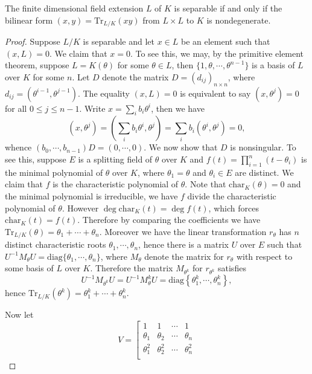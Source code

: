 \begin{theorem}\label{SeparaVSnondege}
The finite dimensional field extension $L$ of $K$ is separable if and only if the bilinear form $(x,y)=\mathrm{Tr}_{L/K}(xy)$ from $L\times L$ to $K$ is nondegenerate.
\end{theorem}
\begin{proof}
Suppose $L/K$ is separable and let $x\in L$ be an element such that $(x,L)=0$. We claim that $x=0$. To see this, we may, by the primitive element theorem, suppose $L=K(\theta)$ for some $\theta\in L$, then $\{1,\theta,\cdots,\theta^{n-1}\}$ is a basis of $L$ over $K$ for some $n$. Let $D$ denote the matrix $D=(d_{ij})_{n\times n}$, where $d_{ij}=(\theta^{i-1},\theta^{j-1})$. The equality $(x,L)=0$ is equivalent to say $(x,\theta^{j})=0$ for all $0\le j\le n-1$. Write $x=\sum_ib_i\theta^i$, then we have 
$$
\left( x,\theta ^j \right) =\left( \sum_i{b_i\theta ^i},\theta ^j \right) =\sum_i{b_i\left( \theta ^i,\theta ^j \right)}=0,
$$
whence $\left( b_0,\cdots ,b_{n-1} \right) D=\left( 0,\cdots ,0 \right) $. We now show that $D$ is nonsingular. To see this, suppose $E$ is a splitting field of $\theta$ over $K$ and $f(t)=\prod_{i=1}^n(t-\theta_i)$ is the minimal polynomial of $\theta$ over $K$, where $\theta_1=\theta$ and $\theta_i\in E$ are distinct. We claim that $f$ is the characteristic polynomial of $\theta$. Note that $\mathrm{char}_K(\theta)=0$ and the minimal polynomial is irreducible, we have $f$ divide the characteristic polynomial of $\theta$. However $\deg\mathrm{char}_K(t)=\deg f(t)$, which forces $\mathrm{char}_K(t)=f(t)$. Therefore by comparing the coefficients we have $\mathrm{Tr}_{L/K}(\theta)=\theta_1+\cdots+\theta_n$. Moreover we have the linear transformation $r_\theta$ has $n$ distinct characteristic roots $\theta_1,\cdots,\theta_n$, hence there is a matrix $U$ over $E$ such that $U^{-1}M_\theta U=\mathrm{diag}\{\theta_1,\cdots,\theta_n\}$, where $M_\theta$ denote the matrix for $r_\theta$ with respect to some basis of $L$ over $K$. Therefore the matrix $M_{\theta^k}$ for $r_{\theta^k}$ satisfies 
$$
U^{-1}M_{\theta ^k}U=U^{-1}M_{\theta}^{k}U=\mathrm{diag}\left\{ \theta _{1}^{k},\cdots ,\theta _{n}^{k} \right\} ,
$$
hence $\mathrm{Tr}_{L/K}(\theta^k)=\theta_1^k+\cdots+\theta_n^k$.\par
Now let 
$$
V=\left[\begin{matrix}
	1&		1&		\cdots&		1\\
	\theta _1&		\theta _2&		\cdots&		\theta _n\\
	\theta _{1}^{2}&		\theta _{2}^{2}&		\cdots&		\theta _{n}^{2}\\

\end{matrix}$$
\end{proof}
